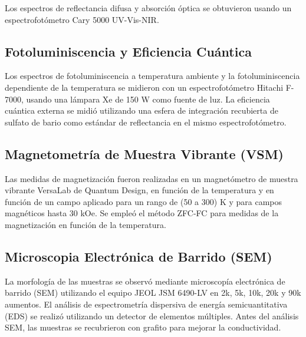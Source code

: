 Los espectros de reflectancia difusa y absorción óptica se obtuvieron usando un
espectrofotómetro Cary 5000 UV-Vis-NIR.

\subsection{Fotoluminiscencia y Eficiencia Cuántica}

Los espectros de fotoluminiscencia a temperatura ambiente y la
fotoluminiscencia dependiente de la temperatura se midieron con un
espectrofotómetro Hitachi F-7000, usando una lámpara Xe de 150 W como fuente de
luz. La eficiencia cuántica externa se midió utilizando una esfera de
integración recubierta de sulfato de bario como estándar de reflectancia en el
mismo espectrofotómetro.

\subsection{Magnetometría de Muestra Vibrante (VSM)}

Las medidas de magnetización fueron
realizadas en un magnetómetro de muestra vibrante VersaLab de Quantum Design, en
función de la temperatura y en función de un campo aplicado para un rango de
(50 a 300) K y para campos magnéticos hasta 30 kOe. Se empleó el método ZFC-FC para
medidas de la magnetización en función de la temperatura.

\subsection{Microscopia Electrónica de Barrido (SEM)}

La morfología de las muestras se observó mediante microscopía electrónica de
barrido (SEM) utilizando el equipo JEOL JSM 6490-LV en 2k, 5k, 10k, 20k y 90k aumentos.
El análisis de espectrometría dispersiva de energía semicuantitativa (EDS) se
realizó utilizando un detector de elementos múltiples. Antes del análisis SEM,
las muestras se recubrieron con grafito para mejorar la conductividad.

